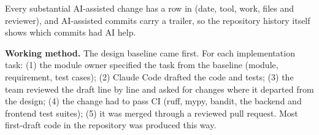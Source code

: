Every substantial AI-assisted change has a row in  (date, tool, work, files and reviewer), and AI-assisted commits carry a  trailer, so the repository history itself shows which commits had AI help.

\textbf{Working method.} The design baseline came first. For each implementation task: (1) the module owner specified the task from the baseline (module, requirement, test cases); (2) Claude Code drafted the code and tests; (3) the team reviewed the draft line by line and asked for changes where it departed from the design; (4) the change had to pass CI (ruff, mypy, bandit, the backend and frontend test suites); (5) it was merged through a reviewed pull request. Most first-draft code in the repository was produced this way.

